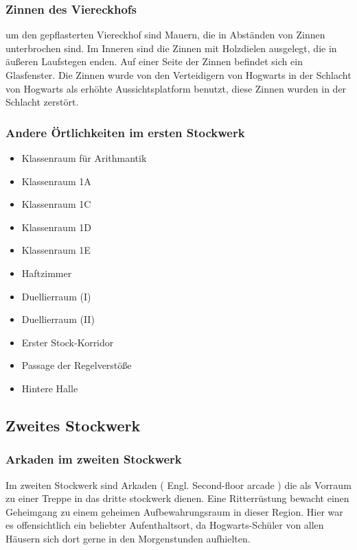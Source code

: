 \documentclass[a4paper, 10pt]{article}
\begin{document}
\subsubsection*{\large Zinnen des Viereckhofs}
um den gepflasterten Viereckhof sind Mauern, die in Abständen von Zinnen unterbrochen sind. Im Inneren sind die Zinnen mit Holzdielen ausgelegt, die in äußeren Laufstegen enden. Auf einer Seite der Zinnen befindet sich ein Glasfenster. Die Zinnen wurde von den Verteidigern von Hogwarts in der Schlacht von Hogwarts als erhöhte Aussichtsplatform benutzt, diese Zinnen wurden in der Schlacht zerstört.
\subsubsection*{\large Andere Örtlichkeiten im ersten Stockwerk}
\vspace{10pt}
\begin{itemize}
    \item Klassenraum für Arithmantik
    \item Klassenraum 1A
    \item Klassenraum 1C
    \item Klassenraum 1D
    \item Klassenraum 1E
    \item Haftzimmer
    \item Duellierraum (I)
    \item Duellierraum (II)
    \item Erster Stock-Korridor
    \item Passage der Regelverstöße
    \item Hintere Halle
\end{itemize}

\subsection*{\Large Zweites Stockwerk}

\subsubsection*{\large Arkaden im zweiten Stockwerk}
Im zweiten Stockwerk sind Arkaden (  Engl.  Second-floor arcade ) die als Vorraum zu einer Treppe in das dritte stockwerk dienen. Eine Ritterrüstung bewacht einen Geheimgang zu einem geheimen Aufbewahrungsraum in dieser Region. Hier war es offensichtlich ein beliebter Aufenthaltsort, da Hogwarts-Schüler von allen Häusern sich dort gerne in den Morgenstunden aufhielten.
\end{document}

